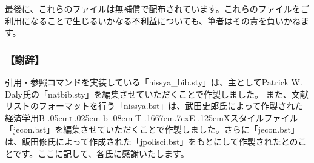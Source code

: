 \documentclass[article, 11pt]{jlreq}
\def\BibTeX{{\textrm{B}\kern-.05em{\textsc{i}\kern-.025em b}\kern-.08em
    T\kern-.1667em\lower.7ex\hbox{E}\kern-.125emX}}
\begin{document}
最後に、これらのファイルは無補償で配布されています。これらのファイルをご利用になることで生じるいかなる不利益についても、筆者はその責を負いかねます。

\subsubsection*{【謝辞】}

引用・参照コマンドを実装している「nissya\_bib.sty」は、主としてPatrick W. Daly氏の「natbib.sty」を編集させていただくことで作製しました。
また、文献リストのフォーマットを行う「nissya.bst」は、武田史郎氏によって作製された経済学用\BibTeX スタイルファイル「jecon.bst」を編集させていただくことで作製しました。さらに「jecon.bst」は、飯田修氏によって作成された「jpolisci.bst」をもとにして作製されたとのことです。ここに記して、各氏に感謝いたします。

\nocite{netville2,Lonkila1995,jsrstyle}


\end{document}
